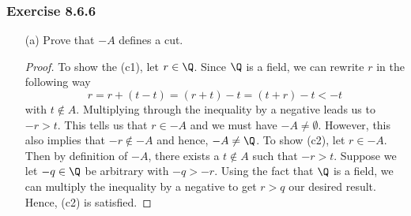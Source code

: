 \subsubsection{Exercise 8.6.6} 
\begin{enumerate}
    \item[(a)] Prove that \( -A  \) defines a cut.
        \begin{proof}
        To show the (c1), let \( r \in \Q  \). Since \( \Q  \) is a field, we can rewrite \( r  \) in the following way
        \[  r = r + (t - t)  = (r+t) - t = (t+r) - t < -t  \] with \( t \not\in A  \). Multiplying through the inequality by a negative leads us to \(  -r > t  \). This tells us that \( r \in -A  \) and we must have \( -A \neq \emptyset  \). However, this also implies that \( -r \notin -A  \) and hence, \( -A \neq \Q  \).
        To show (c2), let \( r \in -A  \). Then by definition of \( -A  \), there exists a \( t \notin A  \) such that \( -r  > t  \). Suppose we let \( -q \in \Q  \) be arbitrary with \( -q > -r  \). Using the fact that \( \Q  \) is a field, we can multiply the inequality by a negative to get \( r > q  \) our desired result. Hence, (c2) is satisfied.


\end{proof}
\end{enumerate}
